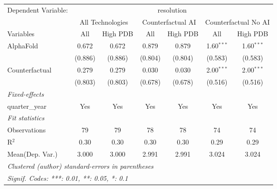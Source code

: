 \begingroup
\centering
\begin{tabular}{lcccccc}
   \tabularnewline \midrule \midrule
   Dependent Variable: & \multicolumn{6}{c}{resolution}\\
 & \multicolumn{2}{c}{All Technologies} & \multicolumn{2}{c}{Counterfactual AI} & \multicolumn{2}{c}{Counterfactual No AI} \\
\cmidrule(lr){1-1}\cmidrule(lr){2-3} \cmidrule(lr){4-5} \cmidrule(lr){6-7}
Variables & \multicolumn{1}{c}{All} & \multicolumn{1}{c}{High PDB} & \multicolumn{1}{c}{All} & \multicolumn{1}{c}{High PDB} & \multicolumn{1}{c}{All} & \multicolumn{1}{c}{High PDB} \\
\cmidrule(lr){1-1}\cmidrule(lr){2-2} \cmidrule(lr){3-3} \cmidrule(lr){4-4} \cmidrule(lr){5-5} \cmidrule(lr){6-6} \cmidrule(lr){7-7}
   AlphaFold      & 0.672   & 0.672   & 0.879   & 0.879   & 1.60$^{***}$ & 1.60$^{***}$\\   
                  & (0.886) & (0.886) & (0.804) & (0.804) & (0.583)      & (0.583)\\   
   Counterfactual & 0.279   & 0.279   & 0.030   & 0.030   & 2.00$^{***}$ & 2.00$^{***}$\\   
                  & (0.803) & (0.803) & (0.678) & (0.678) & (0.516)      & (0.516)\\   
   \midrule
   \emph{Fixed-effects}\\
   quarter\_year  & Yes     & Yes     & Yes     & Yes     & Yes          & Yes\\  
   \midrule
   \emph{Fit statistics}\\
   Observations   & 79      & 79      & 78      & 78      & 74           & 74\\  
   R$^2$          & 0.30    & 0.30    & 0.30    & 0.30    & 0.29         & 0.29\\  
Mean(Dep. Var.) & 3.000 & 3.000 & 2.991 & 2.991 & 3.024 & 3.024 \\
   \midrule \midrule
   \multicolumn{7}{l}{\emph{Clustered (author) standard-errors in parentheses}}\\
   \multicolumn{7}{l}{\emph{Signif. Codes: ***: 0.01, **: 0.05, *: 0.1}}\\
\end{tabular}
\par\endgroup
